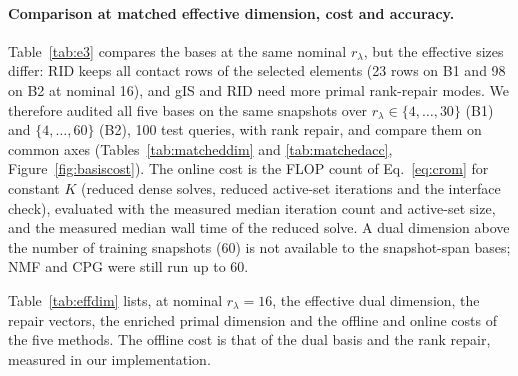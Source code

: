 \documentclass[11pt,a4paper]{article}
\begin{document}
\paragraph{Comparison at matched effective dimension, cost and accuracy.}
Table~\ref{tab:e3} compares the bases at the same nominal $r_\lambda$, but the effective sizes differ: RID keeps all contact rows of the selected elements (23 rows on B1 and 98 on B2 at nominal 16), and gIS and RID need more primal rank-repair modes. We therefore audited all five bases on the same snapshots over $r_\lambda \in \{4,\dots,30\}$ (B1) and $\{4,\dots,60\}$ (B2), 100 test queries, with rank repair, and compare them on common axes (Tables~\ref{tab:matcheddim} and \ref{tab:matchedacc}, Figure~\ref{fig:basiscost}). The online cost is the FLOP count of Eq.~\eqref{eq:crom} for constant $K$ (reduced dense solves, reduced active-set iterations and the interface check), evaluated with the measured median iteration count and active-set size, and the measured median wall time of the reduced solve. A dual dimension above the number of training snapshots (60) is not available to the snapshot-span bases; NMF and CPG were still run up to 60.

Table~\ref{tab:effdim} lists, at nominal $r_\lambda = 16$, the effective dual dimension, the repair vectors, the enriched primal dimension and the offline and online costs of the five methods. The offline cost is that of the dual basis and the rank repair, measured in our implementation.

\begin{table}[htbp]
\centering
\small
\caption{Nominal and effective dimensions, primal repair, and offline and online cost of the five methods at nominal $r_\lambda = 16$ (100 test queries; online time is the median reduced-solve time).}
\label{tab:effdim}

\end{table}

\begin{table}[htbp]
\centering
\small
\caption{Median relative energy error at matched effective dual dimension $r_\lambda^{\mathrm{eff}}$, with the effective dual and enriched primal dimensions in parentheses. The entry nearest to the target within $25\%$ is used; ``n/a'' means the basis cannot be built at that size (RID on B2 keeps at least 61 rows). Signed SVD is the only basis whose error stays near one.}
\label{tab:matcheddim}

\end{table}

\begin{table}[htbp]
\centering
\small
\caption{Cheapest entry whose median error is at most the target: effective dual / enriched primal dimension, online FLOPs per query (thousands, Eq.~\eqref{eq:crom}), measured reduced-solve time in $\mu$s. ``Not reached'' means no entry up to $r_\lambda = 30$ (B1) or $60$ (B2) attains the target.}
\label{tab:matchedacc}

\end{table}
\end{document}
